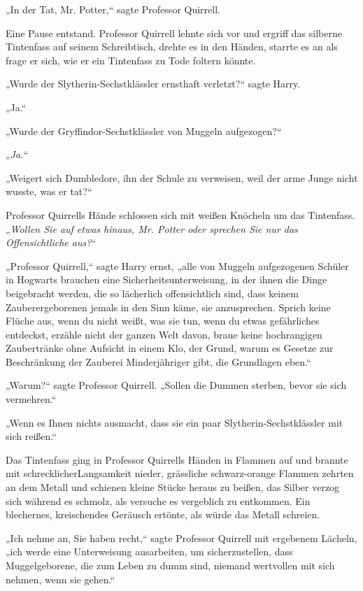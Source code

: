 {„In der Tat, Mr. Potter,“ sagte Professor Quirrell.

Eine Pause entstand. Professor Quirrell lehnte sich vor und ergriff das silberne Tintenfass auf seinem Schreibtisch, drehte es in den Händen, starrte es an als frage er sich, wie er ein Tintenfass zu Tode foltern könnte.

„Wurde der Slytherin-Sechstklässler ernsthaft verletzt?“ sagte Harry.

„Ja.“

„Wurde der Gryffindor-Sechstklässler von Muggeln aufgezogen?“

„\emph{Ja.}“

„Weigert sich Dumbledore, ihn der Schule zu verweisen, weil der arme Junge nicht wusste, was er tat?“

Professor Quirrells Hände schlossen sich mit weißen Knöcheln um das Tintenfass. „\emph{Wollen Sie auf etwas hinaus, Mr. Potter oder sprechen Sie nur das} \emph{Offensichtliche aus?}“

„Professor Quirrell,“ sagte Harry ernst, „alle von Muggeln aufgezogenen Schüler in Hogwarts brauchen eine Sicherheitsunterweisung, in der ihnen die Dinge beigebracht werden, die so lächerlich offensichtlich sind, dass keinem Zauberergeborenen jemals in den Sinn käme, sie anzusprechen. Sprich keine Flüche aus, wenn du nicht weißt, was sie tun, wenn du etwas gefährliches entdeckst, erzähle nicht der ganzen Welt davon, braue keine hochrangigen Zaubertränke ohne Aufsicht in einem Klo, der Grund, warum es Gesetze zur Beschränkung der Zauberei Minderjähriger gibt, die Grundlagen eben.“

„Warum?“ sagte Professor Quirrell. „Sollen die Dummen sterben, bevor sie sich vermehren.“

„Wenn es Ihnen nichts ausmacht, dass sie ein paar Slytherin-Sechstklässler mit sich reißen.“

Das Tintenfass ging in Professor Quirrells Händen in Flammen auf und brannte mit schrecklicherLangsamkeit nieder, grässliche schwarz-orange Flammen zehrten an dem Metall und schienen kleine Stücke heraus zu beißen, das Silber verzog sich während es schmolz, als versuche es vergeblich zu entkommen. Ein blechernes, kreischendes Geräusch ertönte, als würde das Metall schreien.

„Ich nehme an, Sie haben recht,“ sagte Professor Quirrell mit ergebenem Lächeln, „ich werde eine Unterweisung ausarbeiten, um sicherzustellen, dass Muggelgeborene, die zum Leben zu dumm sind, niemand wertvollen mit sich nehmen, wenn sie gehen.“

}

